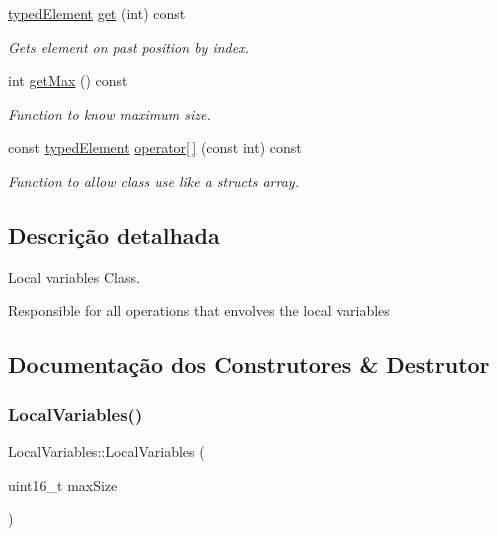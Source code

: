 \begin{DoxyCompactItemize}
\hyperlink{structtypedElement__s}{typed\+Element} \hyperlink{classLocalVariables_a4abbb4a732d7dd0f11a147b79c15ae10}{get} (int) const
\begin{DoxyCompactList}\small\item\em Gets element on past position by index. \end{DoxyCompactList}\item 
\mbox{\label{classLocalVariables_af8d5da296932e0ddb5fcc46fa1a1d7a3}} 
int \hyperlink{classLocalVariables_af8d5da296932e0ddb5fcc46fa1a1d7a3}{get\+Max} () const
\begin{DoxyCompactList}\small\item\em Function to know maximum size. \end{DoxyCompactList}\item 
const \hyperlink{structtypedElement__s}{typed\+Element} \hyperlink{classLocalVariables_a6e978f3c992385f2909261e995105142}{operator\mbox{[}$\,$\mbox{]}} (const int) const
\begin{DoxyCompactList}\small\item\em Function to allow class use like a struct\textquotesingle{}s array. \end{DoxyCompactList}\end{DoxyCompactItemize}


\subsection{Descrição detalhada}
Local variables Class. 

Responsible for all operations that envolves the local variables 

\subsection{Documentação dos Construtores \& Destrutor}
\mbox{\label{classLocalVariables_ae354d02f996f4f584fe857d9304161c1}} 
\subsubsection{\texorpdfstring{Local\+Variables()}{LocalVariables()}}
{\footnotesize\ttfamily Local\+Variables\+::\+Local\+Variables (\begin{DoxyParamCaption}\item[{uint16\+\_\+t}]{max\+Size }\end{DoxyParamCaption})}



